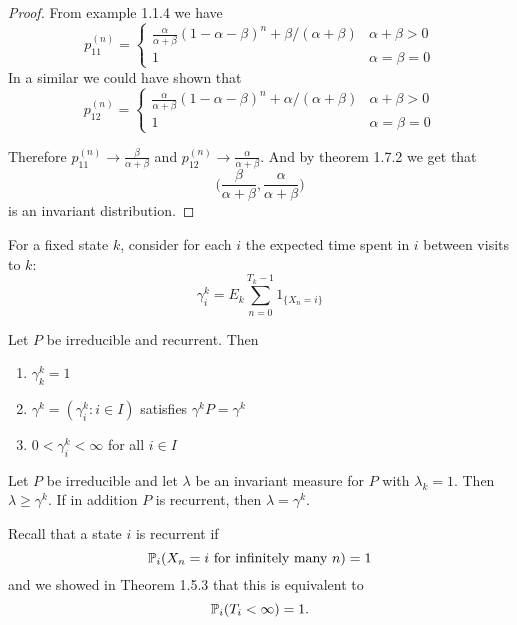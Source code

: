 \begin{proof}
From example 1.1.4 we have
\[
p_{11}^{(n)}=
\begin{cases}\frac{\alpha }{\alpha +\beta } (1-\alpha -\beta )^n+\beta /(\alpha +\beta ) &\alpha +\beta >0 \\
1 &\alpha =\beta =0\end{cases}
\]
In a similar we could have shown that
\[
p_{12}^{(n)}=
\begin{cases}\frac{\alpha }{\alpha +\beta } (1-\alpha -\beta )^n+\alpha /(\alpha +\beta ) &\alpha +\beta >0 \\
1 &\alpha =\beta =0\end{cases}
\]

Therefore \(p_{11}^{(n)}\rightarrow \frac{\beta }{\alpha +\beta }\) and \(p_{12}^{(n)}\rightarrow \frac{\alpha }{\alpha +\beta }\). And by theorem 1.7.2 we get that
\[
\bigg(\frac{\beta }{\alpha +\beta },\frac{\alpha }{\alpha +\beta }\bigg)
\]
is an invariant distribution.
\end{proof}

\begin{defn}
For a fixed state \(k\), consider for each \(i\) the expected time spent in \(i\) between visits to \(k\):
\[
\gamma _{i}^k=E_{k} \sum _{n=0}^{T_{k}-1}1_{\{X_{n}=i\}}
\]
\end{defn}

\begin{thm}[Theorem 1.7.5]
Let \(P\) be irreducible and recurrent. Then

\begin{enumerate}
  \item \(\gamma _{k}^k=1\)
  \item \(\gamma ^k=(\gamma _{i}^k:i\in I)\) satisfies \(\gamma ^kP=\gamma ^k\)
  \item \(0<\gamma _{i}^k<\infty \) for all \(i\in I\)
\end{enumerate}
\end{thm}


\begin{thm}[Theorem 1.7.6]
Let \(P\) be irreducible and let \(\lambda \) be an invariant measure for \(P\) with \(\lambda _{k}=1\). Then \(\lambda \geq \gamma ^k\). If in addition \(P\) is recurrent, then \(\lambda =\gamma ^k\).
\end{thm}

Recall that a state \(i\) is recurrent if
\[
\Bbb{P}_{i}(X_{n}=i \text{ for infinitely many } n)=1
\]
and we showed in Theorem 1.5.3 that this is equivalent to
\[
\Bbb{P}_{i}(T_{i}<\infty )=1.
\]

